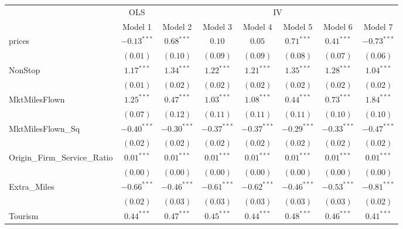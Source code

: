 
\begin{tabular}{l c c c c c c c}
\toprule
 & \multicolumn{1}{c}{OLS} & \multicolumn{6}{c}{IV} \\
\cmidrule(lr){2-2} \cmidrule(lr){3-8}
 & Model 1 & Model 2 & Model 3 & Model 4 & Model 5 & Model 6 & Model 7 \\
\midrule
prices                       & $-0.13^{***}$ & $0.68^{***}$  & $0.10$        & $0.05$        & $0.71^{***}$     & $0.41^{***}$  & $-0.73^{***}$  \\
                             & $(0.01)$      & $(0.10)$      & $(0.09)$      & $(0.09)$      & $(0.08)$         & $(0.07)$      & $(0.06)$       \\
NonStop                      & $1.17^{***}$  & $1.34^{***}$  & $1.22^{***}$  & $1.21^{***}$  & $1.35^{***}$     & $1.28^{***}$  & $1.04^{***}$   \\
                             & $(0.01)$      & $(0.02)$      & $(0.02)$      & $(0.02)$      & $(0.02)$         & $(0.02)$      & $(0.02)$       \\
MktMilesFlown                & $1.25^{***}$  & $0.47^{***}$  & $1.03^{***}$  & $1.08^{***}$  & $0.44^{***}$     & $0.73^{***}$  & $1.84^{***}$   \\
                             & $(0.07)$      & $(0.12)$      & $(0.11)$      & $(0.11)$      & $(0.11)$         & $(0.10)$      & $(0.10)$       \\
MktMilesFlown\_Sq            & $-0.40^{***}$ & $-0.30^{***}$ & $-0.37^{***}$ & $-0.37^{***}$ & $-0.29^{***}$    & $-0.33^{***}$ & $-0.47^{***}$  \\
                             & $(0.02)$      & $(0.02)$      & $(0.02)$      & $(0.02)$      & $(0.02)$         & $(0.02)$      & $(0.02)$       \\
Origin\_Firm\_Service\_Ratio & $0.01^{***}$  & $0.01^{***}$  & $0.01^{***}$  & $0.01^{***}$  & $0.01^{***}$     & $0.01^{***}$  & $0.01^{***}$   \\
                             & $(0.00)$      & $(0.00)$      & $(0.00)$      & $(0.00)$      & $(0.00)$         & $(0.00)$      & $(0.00)$       \\
Extra\_Miles                 & $-0.66^{***}$ & $-0.46^{***}$ & $-0.61^{***}$ & $-0.62^{***}$ & $-0.46^{***}$    & $-0.53^{***}$ & $-0.81^{***}$  \\
                             & $(0.02)$      & $(0.03)$      & $(0.03)$      & $(0.03)$      & $(0.03)$         & $(0.03)$      & $(0.02)$       \\
Tourism                      & $0.44^{***}$  & $0.47^{***}$  & $0.45^{***}$  & $0.44^{***}$  & $0.48^{***}$     & $0.46^{***}$  & $0.41^{***}$   \\

\end{tabular}
